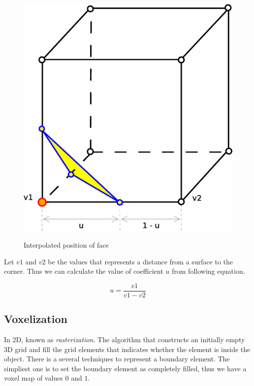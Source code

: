 \begin{figure}[!htbp]
\centering
\includegraphics[scale=0.35]{../img/marc_cub_inter.eps}
\label{fig:mc_interpolation}
\caption{Interpolated position of face}
\end{figure}

Let $v1$ and $v2$ be the values that represents a distance from a surface to the corner.
Thus we can calculate the value of coefficient $u$ from following equation.

\begin{equation}
u = \frac{v1}{v1-v2}
\end{equation}


\subsection{Voxelization}
\label{sub:vox}

In 2D, known as \emph{rasterization}. The algorithm that constructs an initially empty 3D grid and fill 
the
grid elements that indicates whether the element is inside the object. There is a several techniques
to represent a boundary element. The simpliest one is to set the boundary element as completely filled, 
thus we have a voxel map of values $0$ and $1$.\\

